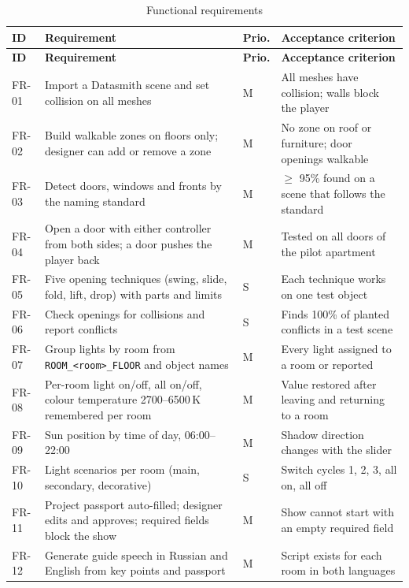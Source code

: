 {\begin{tightblock}\footnotesize
\begin{longtable}{P{1.1cm} P{6.3cm} P{0.9cm} P{4.6cm}}
\caption{Functional requirements}\label{tab:fr}\\
\toprule
\textbf{ID} & \textbf{Requirement} & \textbf{Prio.} & \textbf{Acceptance criterion} \\
\midrule
\endfirsthead
\toprule
\textbf{ID} & \textbf{Requirement} & \textbf{Prio.} & \textbf{Acceptance criterion} \\
\midrule
\endhead
FR-01 & Import a Datasmith scene and set collision on all meshes & M & All meshes have collision; walls block the player \\
FR-02 & Build walkable zones on floors only; designer can add or remove a zone & M & No zone on roof or furniture; door openings walkable \\
FR-03 & Detect doors, windows and fronts by the naming standard & M & $\ge$ 95\% found on a scene that follows the standard \\
FR-04 & Open a door with either controller from both sides; a door pushes the player back & M & Tested on all doors of the pilot apartment \\
FR-05 & Five opening techniques (swing, slide, fold, lift, drop) with parts and limits & S & Each technique works on one test object \\
FR-06 & Check openings for collisions and report conflicts & S & Finds 100\% of planted conflicts in a test scene \\
FR-07 & Group lights by room from \texttt{ROOM\_<room>\_FLOOR} and object names & M & Every light assigned to a room or reported \\
FR-08 & Per-room light on/off, all on/off, colour temperature 2700--6500\,K remembered per room & M & Value restored after leaving and returning to a room \\
FR-09 & Sun position by time of day, 06:00--22:00 & M & Shadow direction changes with the slider \\
FR-10 & Light scenarios per room (main, secondary, decorative) & S & Switch cycles 1, 2, 3, all on, all off \\
FR-11 & Project passport auto-filled; designer edits and approves; required fields block the show & M & Show cannot start with an empty required field \\
FR-12 & Generate guide speech in Russian and English from key points and passport & M & Script exists for each room in both languages \\

\end{longtable}
\end{tightblock}}
